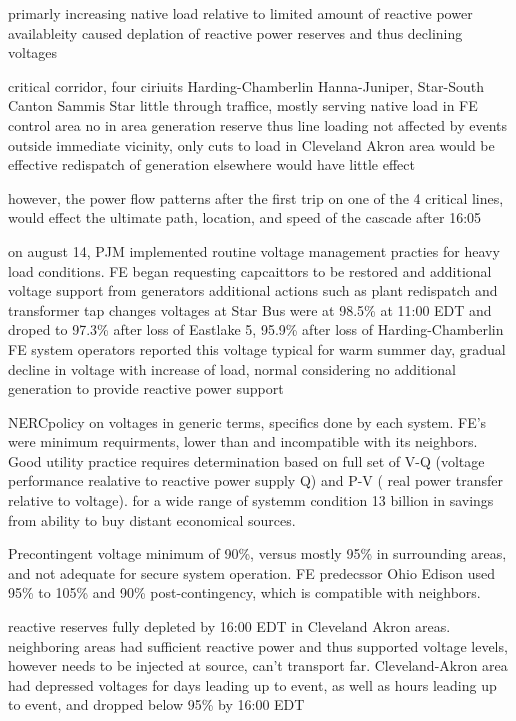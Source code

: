 primarly increasing native load relative to limited amount of reactive power availableity caused deplation of reactive power reserves and thus declining voltages

critical corridor, four ciriuits
Harding-Chamberlin
Hanna-Juniper, Star-South Canton
Sammis Star
little through traffice, mostly serving native load in FE control area
no in area generation reserve
thus line loading not affected by events outside immediate vicinity, only cuts to load in Cleveland Akron area would be effective
redispatch of generation elsewhere would have little effect

however, the power flow patterns after the first trip on one of the 4 critical lines, would effect the ultimate path, location, and speed of the cascade after 16:05

on august 14, PJM implemented routine voltage management practies for heavy load conditions.  FE began requesting capcaittors to be restored and additional voltage support from generators
additional actions such as
plant redispatch and transformer tap changes 
voltages at Star Bus were at 98.5\% at 11:00 EDT and droped to 97.3\% after loss of Eastlake 5, 95.9\% after loss of Harding-Chamberlin
FE system operators reported this voltage typical for warm summer day, gradual decline in voltage with increase of load, normal considering no additional generation to provide reactive power support

NERCpolicy on voltages in generic terms, specifics done by each system.  FE's were minimum requirments, lower than and incompatible with its neighbors.  Good utility practice requires determination based on full set of V-Q (voltage performance realative to reactive power supply Q) and P-V ( real power transfer relative to voltage). for a wide range of systemm condition 13 billion in savings from ability to buy distant economical sources.

Precontingent voltage minimum of 90\%, versus mostly 95\% in surrounding areas, and not adequate for secure system operation.  FE predecssor Ohio Edison used 95\% to 105\% and 90\% post-contingency, which is compatible with neighbors.

reactive reserves fully depleted by 16:00 EDT in Cleveland Akron areas.  neighboring areas had sufficient reactive power and thus supported voltage levels, however needs to be injected at source, can't transport far.  Cleveland-Akron area had depressed voltages for days leading up to event, as well as hours leading up to event, and dropped below 95\% by 16:00 EDT

